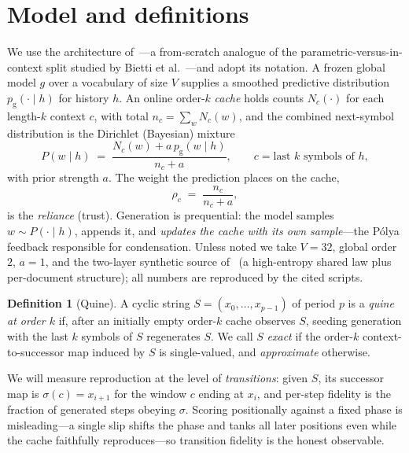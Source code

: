 \documentclass[11pt]{article}
\theoremstyle{plain}
\theoremstyle{definition}
\newtheorem{definition}{Definition}
\theoremstyle{remark}
\newcommand{\pg}{p_{\text{g}}}
\begin{document}
\section{Model and definitions}\label{sec:model}
We use the architecture of~\cite{shumow2026trust}---a from-scratch analogue of the
parametric-versus-in-context split studied by Bietti et al.~\cite{bietti2023}---and adopt its
notation. A frozen global model $g$ over a vocabulary of size $V$ supplies a smoothed
predictive distribution
$\pg(\cdot\mid h)$ for history $h$. An online order-$k$ \emph{cache} holds counts
$N_c(\cdot)$ for each length-$k$ context $c$, with total $n_c=\sum_w N_c(w)$, and the combined
next-symbol distribution is the Dirichlet (Bayesian) mixture
\begin{equation}\label{eq:dir}
P(w\mid h)\;=\;\frac{N_c(w)+a\,\pg(w\mid h)}{n_c+a},
\qquad c=\text{last }k\text{ symbols of }h,
\end{equation}
with prior strength $a$. The weight the prediction places on the cache,
\begin{equation}\label{eq:reliance}
\rho_c \;=\; \frac{n_c}{n_c+a},
\end{equation}
is the \emph{reliance} (trust). Generation is prequential: the model samples
$w\sim P(\cdot\mid h)$, appends it, and \emph{updates the cache with its own sample}---the
P\'olya feedback responsible for condensation. Unless noted we take $V=32$, global order
$2$, $a=1$, and the two-layer synthetic source of~\cite{shumow2026trust} (a high-entropy
shared law plus per-document structure); all numbers are reproduced by the cited scripts.

\begin{definition}[Quine]\label{def:quine}
A cyclic string $S=(x_0,\dots,x_{p-1})$ of period $p$ is a \emph{quine at order $k$} if, after
an initially empty order-$k$ cache observes $S$, seeding generation with the last $k$ symbols
of $S$ regenerates $S$. We call $S$ \emph{exact} if the order-$k$ context-to-successor map
induced by $S$ is single-valued, and \emph{approximate} otherwise.
\end{definition}

We will measure reproduction at the level of \emph{transitions}: given $S$, its successor map
is $\sigma(c)=x_{i+1}$ for the window $c$ ending at $x_i$, and per-step fidelity is the
fraction of generated steps obeying $\sigma$. Scoring positionally against a fixed phase is
misleading---a single slip shifts the phase and tanks all later positions even while the
cache faithfully reproduces---so transition fidelity is the honest observable.
\end{document}

